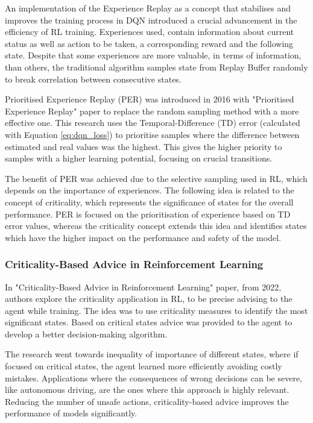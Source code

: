 An implementation of the Experience Replay as a concept that stabilises and improves the training process in DQN introduced a crucial advancement in the efficiency of RL training. Experiences used, contain information about current status as well as action to be taken, a corresponding reward and the following state. Despite that some experiences are more valuable, in terms of information, than others, the traditional algorithm samples state from Replay Buffer randomly to break correlation between consecutive states.

Prioritised Experience Replay (PER) was introduced in 2016 with "Prioritised Experience Replay"\cite{schaul2016prioritizedexperiencereplay} paper to replace the random sampling method with a more effective one. This research uses the Temporal-Difference (TD) error (calculated with Equation \ref{eq:dqn_loss}) to prioritise samples where the difference between estimated and real values was the highest. This gives the higher priority to samples with a higher learning potential, focusing on crucial transitions. 

The benefit of PER was achieved due to the selective sampling used in RL, which depends on the importance of experiences. The following idea is related to the concept of criticality, which represents the significance of states for the overall performance. PER is focused on the prioritisation of experience based on TD error values, whereas the criticality concept extends this idea and identifies states which have the higher impact on the performance and safety of the model.

\subsubsection{Criticality-Based Advice in Reinforcement Learning}\label{ssec:subsubsec_2.3.2}

In "Criticality-Based Advice in Reinforcement Learning"\cite{Spielberg_Azaria_2022} paper, from 2022, authors explore the criticality application in RL, to be precise advising to the agent while training. The idea was to use criticality measures to identify the most significant states. Based on critical states advice was provided to the agent to develop a better decision-making algorithm.

The research went towards inequality of importance of different states, where if focused on critical states, the agent learned more efficiently avoiding costly mistakes. Applications where the consequences of wrong decisions can be severe, like autonomous driving, are the ones where this approach is highly relevant. Reducing the number of unsafe actions, criticality-based advice improves the performance of models significantly.

